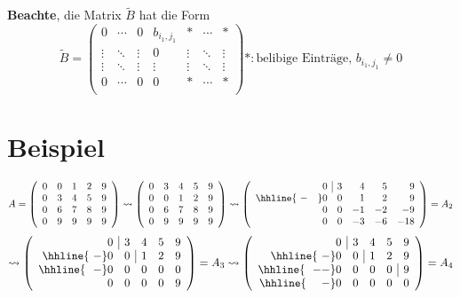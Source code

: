 \documentclass{scrbook}
\begin{document}
\textbf{Beachte}, die Matrix \(\tilde{B}\) hat die Form\\
\[
\tilde{B}=
\left(
\begin{array}{ccccccc}
0&\cdots&0&b_{i_1,j_1}&*&\cdots&*\\
\vdots&\ddots&\vdots&0&\vdots&\ddots&\vdots\\
\vdots&\ddots&\vdots&\vdots&\vdots&\ddots&\vdots\\
0&\cdots&0&0&*&\cdots&*\\
\end{array}
\right)*:\text{belibige Einträge, }b_{i_1,j_1} \neq 0
\]
\section{Beispiel}
\[
A=
\left(
\begin{array}{ccccc}
0&0&1&2&9\\
0&3&4&5&9\\
0&6&7&8&9\\
0&9&9&9&9
\end{array}
\right)
\rightsquigarrow
\left(
\begin{array}{ccccc}
0&3&4&5&9\\
0&0&1&2&9\\
0&6&7&8&9\\
0&9&9&9&9
\end{array}
\right)
\rightsquigarrow
\left(
\begin{array}{rrrrr}
0&\multicolumn{1}{|c}{3}&4&5&9\\
\hhline{~-~~~}
0&0&1&2&9\\
0&0&-1&-2&-9\\
0&0&-3&-6&-18
\end{array}
\right)=A_2
\]
\[
\rightsquigarrow
\left(
\begin{array}{rrrrr}
0&\multicolumn{1}{|c}{3}&4&5&9\\
\hhline{~-}
0&0&\multicolumn{1}{|c}{1}&2&9\\
\hhline{~~-}
0&0&0&0&0\\
0&0&0&0&9
\end{array}
\right)=A_3
\rightsquigarrow
\left(
\begin{array}{rrrrr}
0&\multicolumn{1}{|c}{3}&4&5&9\\
\hhline{~-}
0&0&\multicolumn{1}{|c}{1}&2&9\\
\hhline{~~--}
0&0&0&0&\multicolumn{1}{|c}{9}\\
\hhline{~~~~-}
0&0&0&0&0
\end{array}
\right)=A_4
\]
\\
\end{document}
